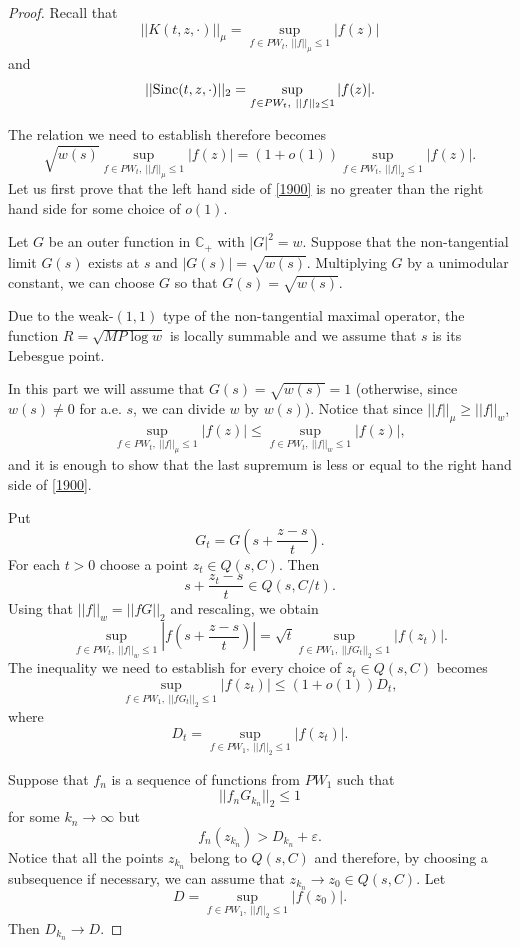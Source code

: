 \documentclass[11pt,twoside,reqno]{amsart}
\def\to{\rightarrow}
\def\C{{\mathbb{C}}}
\def\e{\varepsilon}
\def\S{\text{\rm Sinc}}
\theoremstyle{plain}
\numberwithin{equation}{section}
\begin{document}
\begin{proof}
Recall that
$$||K(t,z, \cdot)||_{\mu}=\sup_{f\in PW_t,\ ||f||_\mu\leq 1} |f(z)| $$
and
$$||\S(t,z, \cdot)||_2=\sup_{f\in PW_t,\ ||f||_2\leq 1} |f(z)|.$$

The relation we need to establish therefore becomes
\begin{equation}\sqrt{w(s)}\sup_{f\in PW_t,\ ||f||_\mu\leq 1} |f(z)|=(1+o(1))\sup_{f\in PW_t,\ ||f||_2\leq 1} |f(z)|.
\label{1900}\end{equation}
Let us first prove that the left hand side of \eqref{1900} is no greater than the right hand side for some choice of
$o(1)$.

Let $G$ be an outer function in $\C_+$ with $|G|^2=w$. Suppose that the non-tangential limit
$G(s)$ exists at  $s$ and $|G(s)|=\sqrt{w(s)}$. Multiplying $G$ by a unimodular constant, we can choose $G$ so that $G(s)=\sqrt{w(s)}$.

Due to the weak-$(1,1)$ type of the non-tangential maximal operator, the function $R=\sqrt{MP\log  w}$
is locally summable and we assume that $s$ is its Lebesgue point.


In this part we will assume that  $G(s)=\sqrt{w(s)}=1$ (otherwise, since $w(s)\neq0$ for a.e. $s$, we can divide $w$ by $w(s)$).
Notice that since $||f||_\mu\geq ||f||_w$,
$$\sup_{f\in PW_t,\ ||f||_\mu\leq 1} |f(z)|\leq\sup_{f\in PW_t,\ ||f||_w\leq 1} |f(z)|,$$
and it is enough to show that the last supremum is less or equal to the right hand side of \eqref{1900}.



 Put $$G_t= G\left(s+\frac {z-s}t\right).$$
 For each $t>0$ choose a point $z_t\in Q(s,C)$. Then
 $$s+\frac{z_t-s}t\in Q(s,C/t).$$
  Using that $||f||_w=||fG||_2$ and rescaling, we obtain
$$\sup_{f\in PW_t,\ ||f||_w\leq 1} \left|f\left(s+\frac {z-s}t\right)\right|=\sqrt{t}\sup_{f\in PW_1,\ ||fG_t||_2\leq 1} |f(z_t)|.$$
The inequality we need to establish for every choice of $z_t\in Q(s,C)$ becomes
\begin{equation}\sup_{f\in PW_1,\ ||fG_t||_2\leq 1} |f(z_t)|\leq (1+o(1))D_t,\label{1011}\end{equation}
where
$$D_t=
\sup_{f\in PW_1,\ ||f||_2\leq 1} |f(z_t)|.$$



Suppose that $f_n$ is a sequence of functions from $PW_1$ such that 
\begin{equation}||f_nG_{k_n}||_2\leq 1\label{eq2022001}\end{equation}
for some $k_n\to\infty$ but
$$f_n(z_{k_n})>D_{k_n}+\e.$$
Notice that all the points $z_{k_n}$ belong to $Q(s,C)$ and therefore, by choosing
a subsequence if necessary, we can assume that $z_{k_n}\to z_0\in Q(s,C)$. Let
$$D=\sup_{f\in PW_1,\ ||f||_2\leq 1} |f(z_0)|.$$ Then $D_{k_n}\to D$.


\end{proof}
\end{document}
